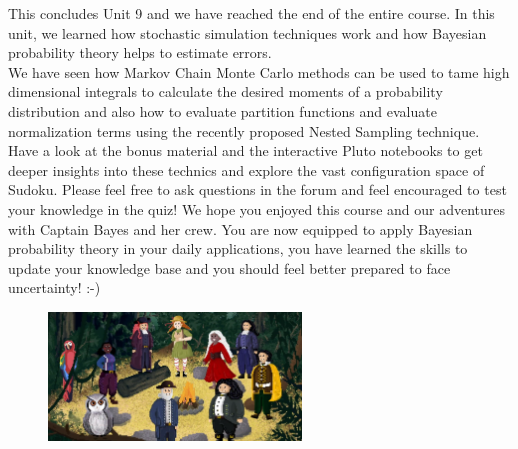 \documentclass[12pt, a4paper]{scrartcl}
\begin{document}
This concludes Unit 9 and we have reached the end of the entire course. In
this unit, we learned how stochastic simulation techniques work and how
Bayesian probability theory helps to estimate errors.\\
We have seen how Markov Chain Monte Carlo methods can be used to tame
high dimensional integrals to calculate the desired moments of a probability distribution and also how to evaluate partition functions and evaluate
normalization terms using the recently proposed Nested Sampling technique.\\

Have a look at the bonus material and the interactive Pluto notebooks to get
deeper insights into these technics and explore the vast conﬁguration space
of Sudoku.
Please feel free to ask questions in the forum and feel encouraged to test your
knowledge in the quiz!
We hope you enjoyed this course and our adventures with Captain Bayes
and her crew. You are now equipped to apply Bayesian probability theory in
your daily applications, you have learned the skills to update your knowledge
base and you should feel better prepared to face uncertainty! :-)
 \begin{figure}[H]
	\centering
	\includegraphics[width=0.6\textwidth]{9_8.png}
\end{figure}
\end{document}

